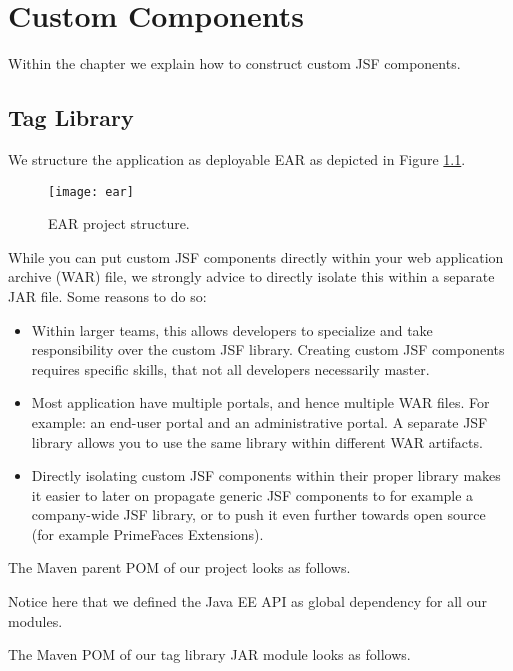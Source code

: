 %

\chapter{Custom Components}
Within the chapter we explain how to construct custom JSF components.

\section{Tag Library}

We structure the application as deployable EAR as depicted in Figure \ref{fig:ear}.
\begin{figure}[htbp]
	\begin{center}
		\texttt{[image: ear]}
		\caption{EAR project structure.}
		\label{fig:ear}
	\end{center}
\end{figure}
While you can put custom JSF components directly within your web application archive (WAR) file,
we strongly advice to directly isolate this within a separate JAR file.
Some reasons to do so:
\begin{itemize}
	\item Within larger teams, this allows developers to specialize and take responsibility over the custom JSF library.
	Creating custom JSF components requires specific skills, that not all developers necessarily master.
	\item Most application have multiple portals, and hence multiple WAR files. For example: an end-user portal and an administrative portal. A separate JSF library allows you to use the same library within different WAR artifacts.
	\item Directly isolating custom JSF components within their proper library makes it easier to later on propagate generic JSF components to for example a company-wide JSF library, or to push it even further towards open source (for example PrimeFaces Extensions).
\end{itemize}
The Maven parent POM of our project looks as follows.

Notice here that we defined the Java EE API as global dependency for all our modules.

The Maven POM of our tag library JAR module looks as follows.


